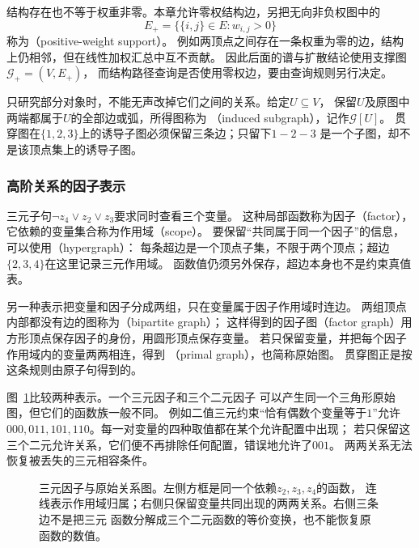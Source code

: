 结构存在也不等于权重非零。本章允许零权结构边，另把无向非负权图中的
\[
  E_+=\{\{i,j\}\in E:w_{i,j}>0\}
\]
称为（positive-weight support）。
例如两顶点之间存在一条权重为零的边，结构上仍相邻，但在线性加权汇总中互不贡献。
因此后面的谱与扩散结论使用支撑图\(\mathcal G_+=(V,E_+)\)，
而结构路径查询是否使用零权边，要由查询规则另行决定。

只研究部分对象时，不能无声改掉它们之间的关系。给定\(U\subseteq V\)，
保留\(U\)及原图中两端都属于\(U\)的全部边或弧，所得图称为
（induced subgraph），记作\(\mathcal G[U]\)。
贯穿图在\(\{1,2,3\}\)上的诱导子图必须保留三条边；只留下\(1-2-3\)
是一个子图，却不是该顶点集上的诱导子图。

\subsubsection{高阶关系的因子表示}
\label{sec:graph-theory-higher-order-scopes}

三元子句\(\neg z_4\lor z_2\lor z_3\)要求同时查看三个变量。
这种局部函数称为因子（factor），它依赖的变量集合称为作用域（scope）。
要保留“共同属于同一个因子”的信息，可以使用（hypergraph）：
每条超边是一个顶点子集，不限于两个顶点；超边\(\{2,3,4\}\)在这里记录三元作用域。
函数值仍须另外保存，超边本身也不是约束真值表。

另一种表示把变量和因子分成两组，只在变量属于因子作用域时连边。
两组顶点内部都没有边的图称为（bipartite graph）；
这样得到的因子图（factor graph）用方形顶点保存因子的身份，用圆形顶点保存变量。
若只保留变量，并把每个因子作用域内的变量两两相连，得到
（primal graph），也简称原始图。
贯穿图正是按这条规则由原子句得到的。

图~\ref{fig:graph-theory-factor-scope}比较两种表示。一个三元因子和三个二元因子
可以产生同一个三角形原始图，但它们的函数族一般不同。
例如二值三元约束“恰有偶数个变量等于\(1\)”允许
\(000,011,101,110\)。每一对变量的四种取值都在某个允许配置中出现；
若只保留这三个二元允许关系，它们便不再排除任何配置，错误地允许了\(001\)。
两两关系无法恢复被丢失的三元相容条件。

\begin{figure}[htbp]
  \centering
  
  \caption{三元因子与原始关系图。左侧方框是同一个依赖\(z_2,z_3,z_4\)的函数，
  连线表示作用域归属；右侧只保留变量共同出现的两两关系。右侧三条边不是把三元
  函数分解成三个二元函数的等价变换，也不能恢复原函数的数值。}
  \label{fig:graph-theory-factor-scope}
\end{figure}

